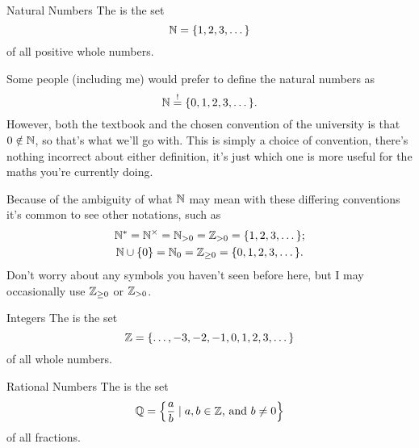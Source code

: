 \documentclass[fleqn]{LectureClass/LectureClass}
\begin{document}
    \begin{dfn}{Natural Numbers}{}
        The  is the set
        \begin{equation}
            \mathbb{N} = \{1, 2, 3, \dotsc\}
        \end{equation}
        of all positive whole numbers.
    \end{dfn}
    \begin{remark}{}{}
        Some people (including me) would prefer to define the natural numbers as
        \begin{equation}
            \mathbb{N} \stackrel{!}{=} \{0, 1, 2, 3, \dotsc\}.
        \end{equation}
        However, both the textbook and the chosen convention of the university is that \(0 \notin \mathbb{N}\), so that's what we'll go with.
        This is simply a choice of convention, there's nothing incorrect about either definition, it's just which one is more useful for the maths you're currently doing.
        
        Because of the ambiguity of what \(\mathbb{N}\) may mean with these differing conventions it's common to see other notations, such as
        \begin{gather}
            \mathbb{N}^{*} = \mathbb{N}^{\times} = \mathbb{N}_{>0} = \mathbb{Z}_{>0} = \{1, 2, 3, \dotsc\};\\
            \mathbb{N} \cup \{0\} = \mathbb{N}_0 = \mathbb{Z}_{\ge 0} = \{0, 1, 2, 3, \dotsc\}.
        \end{gather}
        Don't worry about any symbols you haven't seen before here, but I may occasionally use \(\mathbb{Z}_{\ge 0}\) or \(\mathbb{Z}_{>0}\).
    \end{remark}
    
    \begin{dfn}{Integers}{}
        The  is the set
        \begin{equation}
            \mathbb{Z} = \{\dotsc, -3, -2, -1, 0, 1, 2, 3, \dotsc\}
        \end{equation}
        of all whole numbers.
    \end{dfn}
    
    \begin{dfn}{Rational Numbers}{}
        The  is the set
        \begin{equation}
            \mathbb{Q} = \left\{ \frac{a}{b} \mid a, b \in \mathbb{Z} \text{, and } b \ne 0 \right\}
        \end{equation}
        of all fractions.
    \end{dfn}
    
\end{document}
